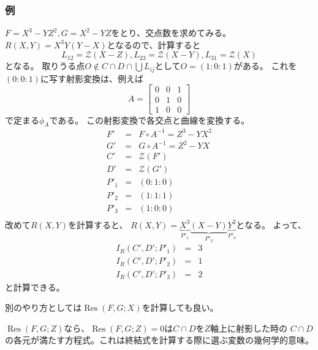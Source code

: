 \documentclass[a4paper]{jsarticle}
\newcommand{\Res}{\operatorname{Res}}
\begin{document}
    \subsubsection{例}
    $F=X^3-YZ^2,G=X^2-YZ$をとり、交点数を求めてみる。
    $R(X,Y)=X^3 Y (Y-X)$となるので、計算すると
    \[ L_{12}=\mathcal{Z}(X-Z), L_{23}=\mathcal{Z}(X-Y),L_{31}=\mathcal{Z}(X) \]
    となる。
    取りうる点$O \not \in C \cap D \cap \bigcup{L_{ij}}$として$O=(1:0:1)$がある。
    これを$(0:0:1)$に写す射影変換は、例えば
    \[
        A=
        \begin{bmatrix}
            0& 0& 1 \\
            0& 1& 0 \\
            1& 0& 0
        \end{bmatrix}
    \]
    で定まる$\phi_A$である。
    この射影変換で各交点と曲線を変換する。
    \begin{eqnarray*}
        F'&=&F \circ A^{-1} =Z^3-YX^2 \\
        G'&=&G \circ A^{-1} =Z^2-YX \\
        C'&=&\mathcal{Z}(F') \\
        D'&=&\mathcal{Z}(G') \\
        P'_{1}&=&(0:1:0) \\
        P'_{2}&=&(1:1:1) \\
        P'_{3}&=&(1:0:0) \\
    \end{eqnarray*}
    改めて$R(X,Y)$を計算すると、
    $R(X,Y)=\underbrace{X^3}_{P'_{1}} \underbrace{(X-Y)}_{P'_{2}} \underbrace{Y^2}_{P'_{3}}$となる。
    よって、
    \begin{eqnarray*}
        I_R(C',D'; P'_{1})&=&3 \\
        I_R(C',D'; P'_{2})&=&1 \\
        I_R(C',D'; P'_{3})&=&2
    \end{eqnarray*}
    と計算できる。

    別のやり方としては$\Res(F,G; X)$を計算しても良い。

    $\Res(F,G; Z)$なら、$\Res(F,G; Z)=0$は$C \cap D$を$Z$軸上に射影した時の
    $C \cap D$の各元が満たす方程式。これは終結式を計算する際に選ぶ変数の幾何学的意味。
\end{document}
